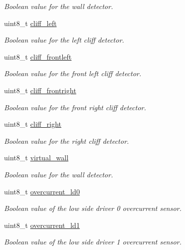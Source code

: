 \begin{DoxyCompactItemize}
\begin{DoxyCompactList}\small\item\em Boolean value for the wall detector. \end{DoxyCompactList}\item 
uint8\_\-t \hyperlink{structoi__t_ae6bc5aecd8f52076a0cf10f39ac0e508}{cliff\_\-left}
\begin{DoxyCompactList}\small\item\em Boolean value for the left cliff detector. \end{DoxyCompactList}\item 
uint8\_\-t \hyperlink{structoi__t_ad6189a6c58988a2e6a9bb47651f675dc}{cliff\_\-frontleft}
\begin{DoxyCompactList}\small\item\em Boolean value for the front left cliff detector. \end{DoxyCompactList}\item 
uint8\_\-t \hyperlink{structoi__t_ac47905c2ddb4c9ffc6bdc72b75231c37}{cliff\_\-frontright}
\begin{DoxyCompactList}\small\item\em Boolean value for the front right cliff detector. \end{DoxyCompactList}\item 
uint8\_\-t \hyperlink{structoi__t_aaeb3aa5ab8fe93603d8b61425e1b20a0}{cliff\_\-right}
\begin{DoxyCompactList}\small\item\em Boolean value for the right cliff detector. \end{DoxyCompactList}\item 
uint8\_\-t \hyperlink{structoi__t_a248f5290596d9691d446f8de7c38342f}{virtual\_\-wall}
\begin{DoxyCompactList}\small\item\em Boolean value for the wall detector. \end{DoxyCompactList}\item 
uint8\_\-t \hyperlink{structoi__t_a32f095a81cb31f60ae9e30e828605e38}{overcurrent\_\-ld0}
\begin{DoxyCompactList}\small\item\em Boolean value of the low side driver 0 overcurrent sensor. \end{DoxyCompactList}\item 
uint8\_\-t \hyperlink{structoi__t_ad7d13aefa5a3616dab94f2aa538e934c}{overcurrent\_\-ld1}
\begin{DoxyCompactList}\small\item\em Boolean value of the low side driver 1 overcurrent sensor. \end{DoxyCompactList}\item 

\end{DoxyCompactItemize}
